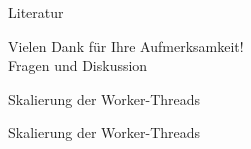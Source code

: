 \documentclass[10pt, ngerman]{beamer}
\begin{document}
\begin{frame}[allowframebreaks]{Literatur}
    
    
\end{frame}

\begin{frame}
    \centering
    \Huge Vielen Dank für Ihre Aufmerksamkeit!\\
    \vspace{1cm}
    \large Fragen und Diskussion
\end{frame}

\alleFolien

\begin{frame}{Skalierung der Worker-Threads}
    \begin{minipage}{\linewidth}
        \centering
        \WorkerthreadsWPDiagrammB
    \end{minipage}
\end{frame}
\begin{frame}{Skalierung der Worker-Threads}
    \begin{minipage}{\linewidth}
        \centering
        \WorkerthreadsWPDiagrammC
    \end{minipage}
\end{frame}
\end{document}
